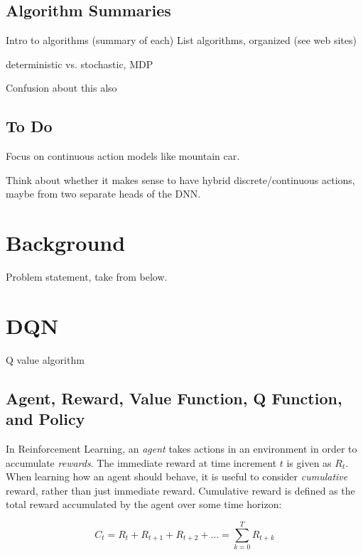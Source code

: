 \documentclass[acmlarge,screen]{acmart}
\begin{document}
\subsection{Algorithm Summaries}


Intro to algorithms (summary of each)
List algorithms, organized (see web sites)






deterministic vs. stochastic, MDP

Confusion about this also






\subsection{To Do}

Focus on continuous action models like mountain car.

Think about whether it makes sense to have hybrid discrete/continuous actions, maybe
from two separate heads of the DNN.



\section{Background}

Problem statement, take from below.



\section{DQN}

Q value algorithm


\subsection{Agent, Reward, Value Function, Q Function, and Policy}

In Reinforcement Learning, an \textit{agent} takes actions in an environment in order to accumulate \textit{rewards}.
The immediate reward at time increment $t$ is given as $R_t$.
When learning how an agent should behave, it is useful to consider \textit{cumulative} reward, 
rather than just immediate reward.
Cumulative reward is defined as the total reward accumulated by the agent over some time horizon:

\begin{equation}
  C_t = R_t + R_{t+1} + R_{t+2} + \ldots = \sum_{k=0}^T R_{t+k} 
\end{equation}
\end{document}
